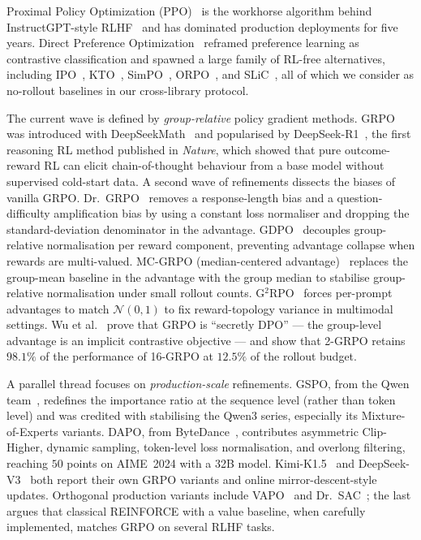 \documentclass{article}
\begin{document}
Proximal Policy Optimization (PPO)~\cite{schulman2017proximal} is the workhorse
algorithm behind InstructGPT-style RLHF~\cite{ouyang2022training, christiano2017deeprlhf, stiennon2020summarize, bai2022hhrlhf, bai2022claudecai}
and has dominated production deployments for five years. Direct Preference
Optimization~\cite{rafailov2024direct} reframed preference learning as
contrastive classification and spawned a large family of RL-free alternatives,
including IPO~\cite{azar2024ipo}, KTO~\cite{ethayarajh2024kto},
SimPO~\cite{meng2024simpo}, ORPO~\cite{hong2024orpo}, and
SLiC~\cite{zhao2023slic}, all of which we consider as no-rollout baselines in
our cross-library protocol.

The current wave is defined by \emph{group-relative} policy gradient methods.
GRPO was introduced with DeepSeekMath~\cite{shao2024deepseekmath} and
popularised by DeepSeek-R1~\cite{guo2025deepseekr1, guo2025deepseekr1nature}, the
first reasoning RL method published in \emph{Nature}, which showed that
pure outcome-reward RL can elicit chain-of-thought behaviour from a base
model without supervised cold-start data. A second wave of refinements
dissects the biases of vanilla GRPO. Dr.~GRPO~\cite{tong2025drgrpo} removes a
response-length bias and a question-difficulty amplification bias by using a
constant loss normaliser and dropping the standard-deviation denominator in the
advantage. GDPO~\cite{liu2026gdpo} decouples group-relative normalisation per
reward component, preventing advantage collapse when rewards are multi-valued.
MC-GRPO (median-centered advantage)~\cite{mcgrpo2025} replaces the
group-mean baseline in the advantage with the group median to stabilise
group-relative normalisation under small rollout counts. G$^{2}$RPO~\cite{hu2026openvlthinker} forces per-prompt
advantages to match $\mathcal{N}(0,1)$ to fix reward-topology variance in
multimodal settings. Wu et al.~\cite{wu2025grpo_dpo} prove that GRPO is
``secretly DPO'' --- the group-level advantage is an implicit contrastive
objective --- and show that 2-GRPO retains $98.1\%$ of the performance of
16-GRPO at $12.5\%$ of the rollout budget.

A parallel thread focuses on \emph{production-scale} refinements. GSPO, from
the Qwen team~\cite{qwen2025gspo}, redefines the importance ratio at the
sequence level (rather than token level) and was credited with stabilising the
Qwen3 series, especially its Mixture-of-Experts variants. DAPO, from
ByteDance~\cite{yu2025dapo}, contributes asymmetric Clip-Higher, dynamic
sampling, token-level loss normalisation, and overlong filtering, reaching
$50$ points on AIME~2024 with a 32B model. Kimi-K1.5~\cite{team2025kimi15, team2025kimik2} and DeepSeek-V3~\cite{deepseek2024v3} both report their own
GRPO variants and online mirror-descent-style updates. Orthogonal
production variants include
VAPO~\cite{bytedance2025vapo} and
Dr.~SAC~\cite{ahmadian2024backtobasics}; the last argues that classical
REINFORCE with a value baseline, when carefully implemented, matches GRPO on
several RLHF tasks.
\end{document}
